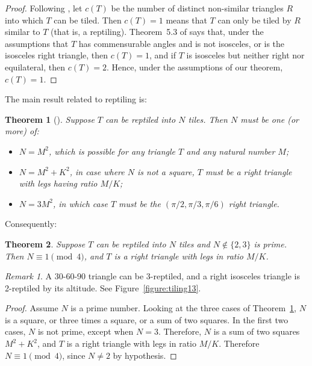 \documentclass{amsart}
\theoremstyle{plain}
\newtheorem{theorem}{Theorem}
\theoremstyle{definition}
\theoremstyle{remark}
\newtheorem*{remark}{Remark}
\begin{document}
\begin{proof} Following \cite{laczkovich1995}, let $c(T)$ be the 
number of distinct non-similar triangles $R$ into which $T$ can be tiled.  Then $c(T) = 1$ 
means that $T$
can only be tiled by $R$ similar to $T$ (that is, a reptiling). 
Theorem~5.3 of \cite{laczkovich1995} says that, under the assumptions that $T$ has
commensurable angles and is not isosceles, or is the isosceles right triangle,
then $c(T) = 1$, and if $T$ is isosceles but neither right nor equilateral, then $c(T) = 2$.
Hence, under the assumptions of our theorem, $c(T) = 1$. 
\end{proof}

The main result related to reptiling is:
\begin{theorem}[\cite{snover1991}]
    \label{theorem:reptile} Suppose $T$ can be reptiled into $N$ tiles. Then $N$ must be one (or more) of:
    \begin{itemize}
        \item $N = M^2$, which is possible for any triangle $T$ and any natural number $M$;
        \item $N = M^2 + K^2$, in case where $N$ is not a square, $T$ must be a right triangle with legs having ratio $M/K$;
        \item $N = 3M^2$, in which case $T$ must be the $(\pi/2, \pi/3, \pi/6)$ right triangle.
    \end{itemize}
\end{theorem}

Consequently:
\begin{theorem} \label{theorem:reptilenotprime}  
Suppose $T$ can be reptiled into $N$ tiles and $N \not\in\{2, 3\}$ is prime. 
Then $N \equiv 1 \pmod 4$, and 
$T$ is a right triangle with legs in ratio $M/K$.
\end{theorem}

\begin{remark} A 30-60-90 triangle can be 3-reptiled, and a right isosceles triangle is 2-reptiled by its altitude.
See Figure~\ref{figure:tiling13}.   
\end{remark}

\begin{proof}  Assume $N$ is a prime number.
Looking at the three cases of Theorem~\ref{theorem:reptile}, $N$ is a square, or three times a square, or 
a sum of two squares.  In the first two cases, $N$ is not prime, except when $N=3$.
  Therefore, $N$  is a sum
of two squares $M^2 + K^2$, and $T$ is a right triangle with legs in ratio $M/K$.  Therefore
$N \equiv 1 \pmod 4$, since $N \neq 2$ by hypothesis.
\end{proof}
\end{document}
